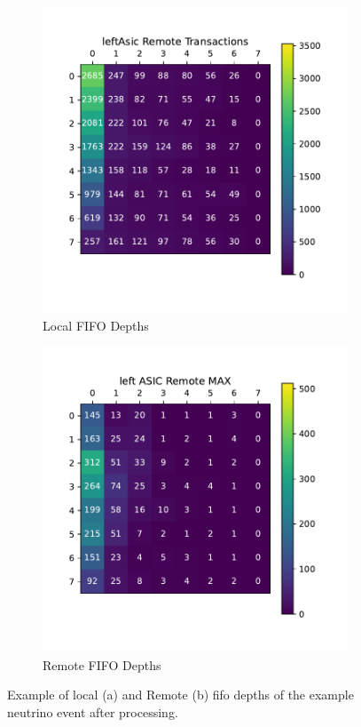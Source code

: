 \begin{figure}
\centering
\begin{subfigure}{.5\textwidth}
  \centering
  \includegraphics[width=\textwidth]{images/left_asic_trans.pdf}
  \caption{Local FIFO Depths}
\end{subfigure}%
\begin{subfigure}{.5\textwidth}
  \centering
  \includegraphics[width=\textwidth]{images/left_asic_remote.pdf}
  \caption{Remote FIFO Depths}
\end{subfigure}
\caption{Example of local (a) and Remote (b) fifo depths of the example neutrino event after processing.}
\label{fig:left_example_neutrino}
\end{figure}

